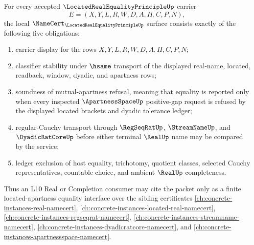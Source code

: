 \begin{theorem}
\label{thm:located-real-equality-principle-namecert-obligations}
For every accepted $\LocatedRealEqualityPrincipleUp$ carrier
$$
E=(X,Y,L,R,W,D,A,H,C,P,N),
$$
the local $\NameCert_{\LocatedRealEqualityPrincipleUp}$ surface consists exactly of the following five obligations:
\begin{enumerate}
\item carrier display for the rows $X,Y,L,R,W,D,A,H,C,P,N$;
\item classifier stability under $\hsame$ transport of the displayed real-name, located, readback, window, dyadic, and apartness rows;
\item soundness of mutual-apartness refusal, meaning that equality is reported only when every inspected $\ApartnessSpaceUp$ positive-gap request is refused by the displayed located brackets and dyadic tolerance ledger;
\item regular-Cauchy transport through $\RegSeqRatUp$, $\StreamNameUp$, and $\DyadicRatCoreUp$ before either terminal $\RealUp$ name may be compared by the service;
\item ledger exclusion of host equality, trichotomy, quotient classes, selected Cauchy representatives, countable choice, and ambient $\RealUp$ completeness.
\end{enumerate}
Thus an L10 Real or Completion consumer may cite the packet only as a finite located-apartness equality interface over the sibling certificates \autoref{ch:concrete-instances-real-namecert}, \autoref{ch:concrete-instances-located-real-namecert}, \autoref{ch:concrete-instances-regseqrat-namecert}, \autoref{ch:concrete-instances-streamname-namecert}, \autoref{ch:concrete-instances-dyadicratcore-namecert}, and \autoref{ch:concrete-instances-apartnessspace-namecert}.
\end{theorem}
